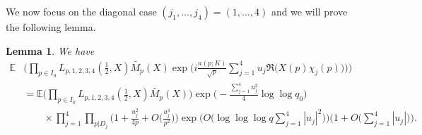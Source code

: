 \documentclass[12pt, reqno]{amsart}
\newcommand{\E}{\mathbb{E}}
\newtheorem{lemma}[theorem]{Lemma}
\numberwithin{equation}{section}
\numberwithin{theorem}{section}
\numberwithin{equation}{section}
\begin{document}
  We now focus on the diagonal case $(j_1,\ldots,j_4)=(1,\ldots,4)$ and we will prove the following lemma.
  \begin{lemma}
  \label{1234}
   We have
   \begin{align*}
       \E & \Bigg( \prod_{p \in I_0} L_{p,1,2,3,4}( \tfrac{1}{2},X) \widetilde{M_p}(X) \exp \bigg(  i \frac{a(p;K)}{
    \sqrt{p}}\sum_{j=1}^4   u_j \Re \big(X(p) \chi_j(p)\big)\bigg) \Bigg) \\
    & = \E \Bigg( \prod_{p \in I_0} L_{p,1,2,3,4}( \tfrac{1}{2},X) \widetilde{M_p}(X) \Bigg) \exp \Big(  - \frac{\sum_{j=1}^4 u_j^2}{4} \log \log q_0 \Big) \\
    &\qquad \times \prod_{j=1}^4 \prod_{p|D_j} \bigg(  1+ \frac{u_j^2}{4p} + O \Big( \frac{u_j^4}{p^2} \Big)\bigg)\exp \bigg( O \Big(  \log \log \log q \sum_{j=1}^4 |u_j|^2\Big) \bigg)  \bigg(1 +O \Big(  \sum_{j=1}^4 |u_j|\Big) \bigg). 
   \end{align*} 
  \end{lemma}
\end{document}
